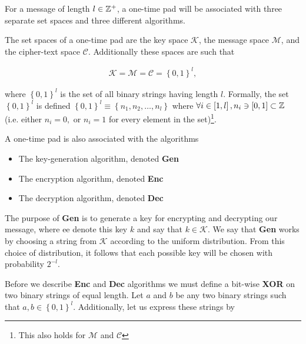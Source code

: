 \documentclass[../midterm.tex]{subfiles}
\begin{document}
\begin{flushleft}




  For a message of length $l \in \mathbb{Z}^+$, a one-time pad will be associated with three separate set spaces and three different algorithms.  \newline

The set spaces of a one-time pad are the key space $\mathcal{K}$, the message space $\mathcal{M}$, and the cipher-text space $\mathcal{C}$.  Additionally these spaces are such that

\begin{align}
\mathcal{K} = \mathcal{M} = \mathcal{C} = \left\{ 0, 1 \right\}^l,
\end{align}

where $\left\{ 0, 1 \right\}^l$ is the set of all binary strings having length $l$. Formally, the set $\left\{ 0, 1 \right\}^l$ is defined $\left\{ 0, 1 \right\}^l \equiv \left\{ n_1, n_2, \dots, n_l \right\}$ where $\forall i \in \left[1, l\right], n_i \ni \left[ 0, 1 \right] \subset \mathbb{Z}$ (i.e. either $n_i = 0,$ or $n_i = 1$ for every element in the set)\footnote{This also holds for $\mathcal{M}$ and $\mathcal{C}$}. \newline

A one-time pad is also associated with the algorithms

\begin{itemize}
	\item The key-generation algorithm, denoted {\selectfont \textbf{Gen}}
	\item The encryption algorithm, denoted {\selectfont \textbf{Enc}}
	\item The decryption algorithm, denoted {\selectfont \textbf{Dec}}
\end{itemize}

The purpose of {\selectfont \textbf{Gen}} is to generate a key for encrypting and decrypting our message, where ee denote this key $k$ and say that $k \in \mathcal{K}$. We say that {\selectfont \textbf{Gen}} works by choosing a string from $\mathcal{K}$ according to the uniform distribution.  From this choice of distribution, it follows that each possible key will be chosen with probability $2^{-l}$. \newline

Before we describe {\selectfont \textbf{Enc}} and {\selectfont \textbf{Dec}} algorithms we must define a bit-wise \textbf{XOR} on two binary strings of equal length. Let $a$ and $b$ be any two binary strings such that $a, b \in \left\{ 0, 1 \right\}^l$.  Additionally, let us express these strings by


\end{flushleft}
\end{document}
